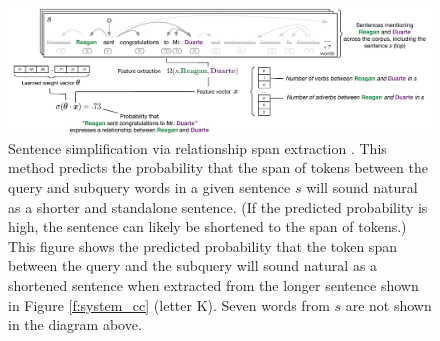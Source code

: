 \begin{figure}[t!]
    \centering
    \includegraphics[width=.9\textwidth]{figures/rsum/rsum_big.pdf}
    \caption[Sentence simplification via relationship span extraction]{Sentence simplification via relationship span extraction \cite{handler-oconnor-2018-relational}.
    This method predicts the probability that the span of tokens between the query and subquery words in a given sentence $s$ will sound natural as a shorter and standalone sentence.
    (If the predicted probability is high, the sentence can likely be shortened to the span of tokens.)
    This figure shows the predicted probability that the token span between the query \textbf{\color{CCPurple}{Duarte}} and the subquery \textbf{\color{darkgreen}{Reagan}} will sound natural as a shortened sentence when extracted from the longer sentence shown in Figure \ref{f:system_cc} (letter K).
    Seven words from $s$ are not shown in the diagram above.}\label{f:rsum}
\end{figure}


